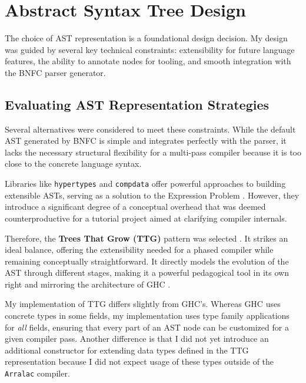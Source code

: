 \section{Abstract Syntax Tree Design}
\label{sec:Design:AST}

The choice of AST representation is a foundational design decision. My design was guided by several key technical constraints: extensibility for future language features, the ability to annotate nodes for tooling, and smooth integration with the BNFC parser generator.

\subsection{Evaluating AST Representation Strategies}
Several alternatives were considered to meet these constraints. While the default AST generated by BNFC is simple and integrates perfectly with the parser, it lacks the necessary structural flexibility for a multi-pass compiler because it is too close to the concrete language syntax.

Libraries like \texttt{hypertypes} \cite{hypertypes-hackage} and \texttt{compdata} \cite{compdata-hackage} offer powerful approaches to building extensible ASTs, serving as a solution to the Expression Problem \cite{wadler-expression-1998}. However, they introduce a significant degree of a conceptual overhead that was deemed counterproductive for a tutorial project aimed at clarifying compiler internals.

Therefore, the \textbf{Trees That Grow (TTG)} pattern was selected \cite{trees-that-grow-2016}. It strikes an ideal balance, offering the extensibility needed for a phased compiler while remaining conceptually straightforward. It directly models the evolution of the AST through different stages, making it a powerful pedagogical tool in its own right and mirroring the architecture of GHC \cite{ghc-gitlab-2025}.


      
\enlargethispage{\baselineskip}
My implementation of TTG differs slightly from GHC's. Whereas GHC uses concrete types in some fields, my implementation uses type family applications for \textit{all} fields, ensuring that every part of an AST node can be customized for a given compiler pass. Another difference is that I did not yet introduce an additional constructor for extending data types defined in the TTG representation because I did not expect usage of these types outside of the \texttt{Arralac} compiler.

